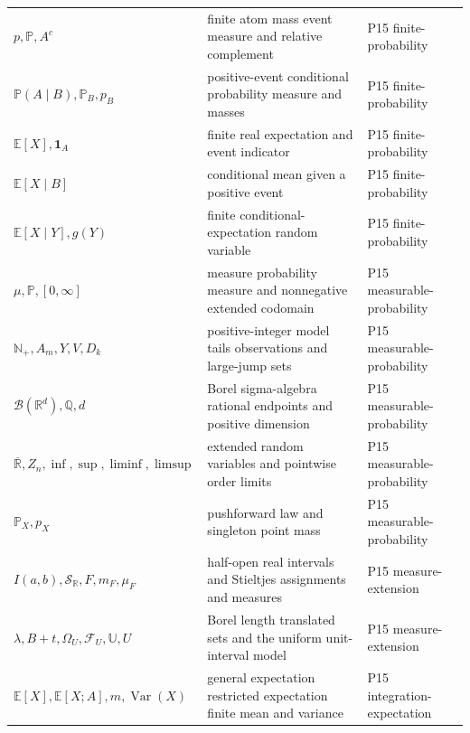 \begin{longtable}{@{}p{}p{}p{}@{}}
\(p,\allowbreak \mathbb P,\allowbreak A^c\) & finite atom mass event measure and relative complement & P15 finite-\allowbreak{}probability \\
\(\mathbb P(A\mid B),\allowbreak \mathbb P_B,\allowbreak p_B\) & positive-event conditional probability measure and masses & P15 finite-\allowbreak{}probability \\
\(\mathbb E[X],\allowbreak \mathbf1_A\) & finite real expectation and event indicator & P15 finite-\allowbreak{}probability \\
\(\mathbb E[X\mid B]\) & conditional mean given a positive event & P15 finite-\allowbreak{}probability \\
\(\mathbb E[X\mid Y],\allowbreak g(Y)\) & finite conditional-expectation random variable & P15 finite-\allowbreak{}probability \\
\(\mu,\allowbreak \mathbb P,\allowbreak [0,\allowbreak \infty]\) & measure probability measure and nonnegative extended codomain & P15 measurable-\allowbreak{}probability \\
\(\mathbb N_+,\allowbreak A_m,\allowbreak Y,\allowbreak V,\allowbreak D_k\) & positive-integer model tails observations and large-jump sets & P15 measurable-\allowbreak{}probability \\
\(\mathcal B(\mathbb R^d),\allowbreak \mathbb Q,\allowbreak d\) & Borel sigma-algebra rational endpoints and positive dimension & P15 measurable-\allowbreak{}probability \\
\(\overline{\mathbb R},\allowbreak Z_n,\allowbreak \inf,\allowbreak \sup,\allowbreak \liminf,\allowbreak \limsup\) & extended random variables and pointwise order limits & P15 measurable-\allowbreak{}probability \\
\(\mathbb P_X,\allowbreak p_X\) & pushforward law and singleton point mass & P15 measurable-\allowbreak{}probability \\
\(I(a,\allowbreak b),\allowbreak \mathcal S_{\mathbb R},\allowbreak F,\allowbreak m_F,\allowbreak \mu_F\) & half-open real intervals and Stieltjes assignments and measures & P15 measure-\allowbreak{}extension \\
\(\lambda,\allowbreak B+t,\allowbreak \Omega_U,\allowbreak \mathcal F_U,\allowbreak \mathbb U,\allowbreak U\) & Borel length translated sets and the uniform unit-interval model & P15 measure-\allowbreak{}extension \\
\(\mathbb E[X],\allowbreak \mathbb E[X;\allowbreak A],\allowbreak m,\allowbreak \operatorname{Var}(X)\) & general expectation restricted expectation finite mean and variance & P15 integration-\allowbreak{}expectation \\

\end{longtable}

